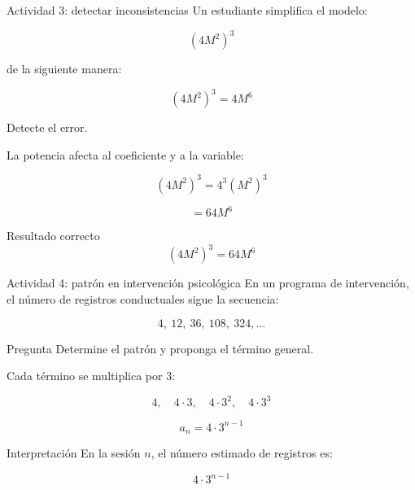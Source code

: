 \documentclass[aspectratio=169]{beamer}
\begin{document}
	
	\begin{frame}{Actividad 3: detectar inconsistencias}
		Un estudiante simplifica el modelo:
		
		\[
		(4M^2)^3
		\]
		
		de la siguiente manera:
		
		\[
		(4M^2)^3=4M^6
		\]
		
		\pause
		
		\begin{alerta}
			Detecte el error.
		\end{alerta}
		
		\pause
		
		La potencia afecta al coeficiente y a la variable:
		
		\[
		(4M^2)^3=4^3(M^2)^3
		\]
		
		\[
		=64M^6
		\]
		
		\pause
		
		\begin{block}{Resultado correcto}
			\[
			(4M^2)^3=64M^6
			\]
		\end{block}
	\end{frame}
	
	
	\begin{frame}{Actividad 4: patrón en intervención psicológica}
		En un programa de intervención, el número de registros conductuales sigue la secuencia:
		
		\[
		4,\ 12,\ 36,\ 108,\ 324,\ldots
		\]
		
		\pause
		
		\begin{block}{Pregunta}
			Determine el patrón y proponga el término general.
		\end{block}
		
		\pause
		
		Cada término se multiplica por \(3\):
		
		\[
		4,\quad 4\cdot3,\quad 4\cdot3^2,\quad 4\cdot3^3
		\]
		
		\pause
		
		\[
		a_n=4\cdot3^{n-1}
		\]
		
		\pause
		
		\begin{block}{Interpretación}
			En la sesión \(n\), el número estimado de registros es:
			
			\[
			4\cdot3^{n-1}
			\]
		\end{block}
	\end{frame}
	
\end{document}
